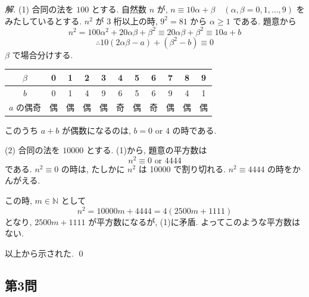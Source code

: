 \documentclass[../main.tex]{subfiles}
\begin{document}
\begin{proof}[解]
  (1) 合同の法を $100$ とする. 自然数 $n$ が, $n \equiv 10\alpha + \beta \quad (\alpha, \beta = 0, 1, \dots, 9)$ をみたしているとする. $n^2$ が 3 桁以上の時, $9^2 = 81$ から $\alpha \ge 1$ である. 題意から
  \[
    n^2 = 100\alpha^2 + 20\alpha\beta + \beta^2 \equiv 20\alpha\beta + \beta^2 \equiv 10a + b
  \]
  \[
    \therefore 10(2\alpha\beta - a) + (\beta^2 - b) \equiv 0
  \]
  $\beta$ で場合分けする.

  \begin{center}
    \begin{tabular}{|c|c|c|c|c|c|c|c|c|c|c|}
      \hline
      $\beta$ & 0 & 1 & 2 & 3 & 4 & 5 & 6 & 7 & 8 & 9 \\ \hline
      $b$ & 0 & 1 & 4 & 9 & 6 & 5 & 6 & 9 & 4 & 1 \\ \hline
      $a$ の偶奇 & 偶 & 偶 & 偶 & 偶 & 奇 & 偶 & 奇 & 偶 & 偶 & 偶 \\ \hline
    \end{tabular}
  \end{center}

  このうち $a+b$ が偶数になるのは, $b = 0$ or $4$ の時である.

  \medskip
  (2) 合同の法を $10000$ とする. (1)から, 題意の平方数は
  \[
    n^2 \equiv 0 \text{ or } 4444
  \]
  である. $n^2 \equiv 0$ の時は, たしかに $n^2$ は 10000 で割り切れる. $n^2 \equiv 4444$ の時をかんがえる.

  この時, $m \in \mathbb{N}$ として
  \[
    n^2 = 10000 m + 4444 = 4(2500 m + 1111)
  \]
  となり, $2500m + 1111$ が平方数になるが, (1)に矛盾. よってこのような平方数はない.

  以上から示された. \qed
\end{proof}

\subsection*{第3問}
\end{document}
